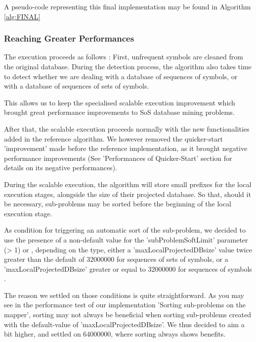 \documentclass{eplmastersthesis}
\begin{document}
A pseudo-code representing this final implementation may be found in Algorithm \ref{alg:FINAL}

\subsubsection{Reaching Greater Performances}

The execution proceeds as follows : First, unfrequent symbols are cleaned from the original database. During the detection process, the algorithm also takes time to detect whether we are dealing with a database of sequences of symbols, or with a database of sequences of sets of symbols.\newline

This allows us to keep the specialised scalable execution improvement which brought great performance improvements to SoS database mining problems. \newline

After that, the scalable execution proceeds normally with the new functionalities added in the reference algorithm. We however removed the quicker-start 'improvement' made before the reference implementation, as it brought negative performance improvements (See 'Performances of Quicker-Start' section for details on its negative performances). \newline

During the scalable execution, the algorithm will store small prefixes for the local execution stages, alongside the size of their projected database. So that, should it be necessary, sub-problems may be sorted before the beginning of the local execution stage. \newline

As condition for triggering an automatic sort of the sub-problem, we decided to use the presence of a non-default value for the 'subProblemSoftLimit' parameter (> 1) or , depending on the type, either a 'maxLocalProjectedDBsize' value twice greater than the default of 32000000 for sequences of sets of symbols, or a 'maxLocalProjectedDBsize' greater or equal to 32000000 for sequences of symbols . \newline

The reason we settled on those conditions is quite straightforward. As you may see in the performance test of our implementation 'Sorting sub-problems on the mapper', sorting may not always be beneficial when sorting sub-problems created with the default-value of 'maxLocalProjectedDBsize'. We thus decided to aim a bit higher, and settled on 64000000, where sorting always shows benefits. \newline
\end{document}

